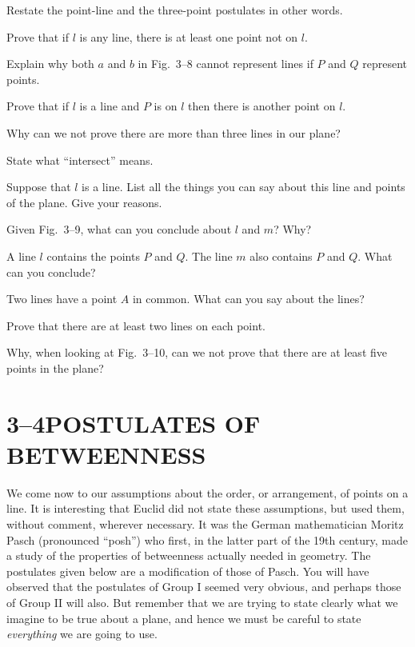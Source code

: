 \documentclass[11pt]{book}
\theoremstyle{bkplain}
\begin{document}
\begin{exercisecols}
\begin{exlist}
\item Restate the point-line and the three-point postulates in other words.
\item Prove that if $l$ is any line, there is at least one point not on $l$.
\item Explain why both $a$ and $b$ in Fig.~3--8 cannot represent lines if $P$ and
      $Q$ represent points.
\exfig{\FIGIIIEIGHT}
\item Prove that if $l$ is a line and $P$ is on $l$ then there is another point
      on $l$.
\item Why can we not prove there are more than three lines in our plane?
\item State what ``intersect'' means.
\item Suppose that $l$ is a line. List all the things you can say about this line
      and points of the plane. Give your reasons.
\item Given Fig.~3--9, what can you conclude about $l$ and $m$? Why?
\exfig{\FIGIIININE}
\item A line $l$ contains the points $P$ and $Q$. The line $m$ also contains $P$
      and $Q$. What can you conclude?
\item Two lines have a point $A$ in common. What can you say about the lines?
\item Prove that there are at least two lines on each point.
\item Why, when looking at Fig.~3--10, can we not prove that there are at least
      five points in the plane?
\exfig{\FIGIIITEN}
\end{exlist}
\end{exercisecols}

\section*{3--4\quad POSTULATES OF BETWEENNESS}

We come now to our assumptions about the order, or arrangement, of points on a
line. It is interesting that Euclid did not state these assumptions, but used
them, without comment, wherever necessary. It was the German mathematician
Moritz Pasch (pronounced ``posh'') who first, in the latter part of the 19th
century, made a study of the properties of betweenness actually needed in
geometry. The postulates given below are a modification of those of Pasch. You
will have observed that the postulates of Group I seemed very obvious, and
perhaps those of Group II will also. But remember that we are trying to state
clearly what we imagine to be true about a plane, and hence we must be careful to
state \emph{everything} we are going to use.
\end{document}
